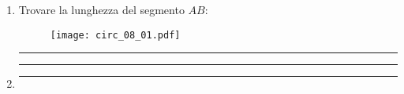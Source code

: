 \begin{enumerate}
\item  \label{circ_09}


Trovare la lunghezza del segmento $AB$:

\begin{figure}[H]
\centering
\texttt{[image: circ\_08\_01.pdf]}
\end{figure}


\vspace{1cm}
\hrule
\vspace{1cm}

 
\vspace{1cm}
\hrule
\vspace{1cm}


\item  \label{circ_10}

\vspace{1cm}
\hrule
\vspace{1cm}




\end{enumerate}

\pagebreak

